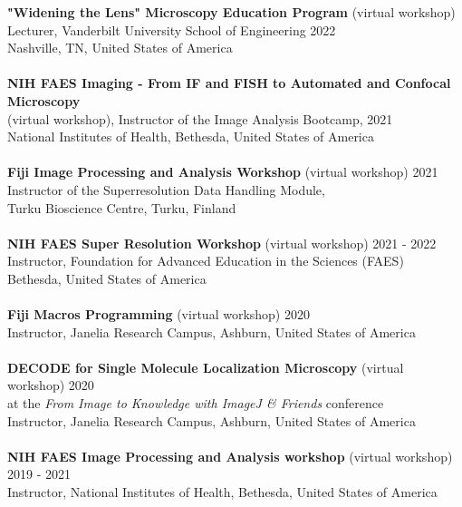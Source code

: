 \documentclass[margin,line]{res}
\begin{document}
\begin{resume}
{\bf  "Widening the Lens" Microscopy Education Program} (virtual workshop)\\ Lecturer, Vanderbilt University School of Engineering \hfill 2022\\
 Nashville, TN, United States of America\\
\vspace*{-3mm}\\
{\bf  NIH FAES Imaging - From IF and FISH to Automated and Confocal Microscopy} \\(virtual workshop), Instructor of the Image Analysis Bootcamp,  \hfill 2021\\
 National Institutes of Health, Bethesda, United States of America\\
\vspace*{-3mm}\\
{\bf  Fiji Image Processing and Analysis Workshop} (virtual workshop)  \hfill 2021\\
Instructor of the Superresolution Data Handling Module, \\Turku Bioscience Centre, Turku, Finland\\
\vspace*{-3mm}\\
{\bf  NIH FAES Super Resolution Workshop} (virtual workshop)  \hfill 2021 - 2022\\
Instructor, Foundation for Advanced Education in the Sciences (FAES)\\
Bethesda, United States of America\\
\vspace*{-3mm}\\
{\bf Fiji Macros Programming} (virtual workshop)  \hfill 2020\\
Instructor, Janelia Research Campus, Ashburn, United States of America\\
\vspace*{-3mm}\\
{\bf DECODE for Single Molecule Localization Microscopy} (virtual workshop)  \hfill 2020\\
at the \emph{From Image to Knowledge with ImageJ \& Friends} conference\\
Instructor, Janelia Research Campus, Ashburn, United States of America\\
\vspace*{-3mm}\\
{\bf  NIH FAES Image Processing and Analysis workshop} (virtual workshop)  \hfill 2019 - 2021\\
 Instructor, National Institutes of Health, Bethesda, United States of America\\

\end{resume}
\end{document}
